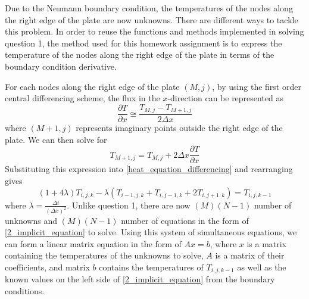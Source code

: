 \documentclass[a4paper]{article}
\begin{document}
	Due to the Neumann boundary condition, the temperatures of the nodes along the right edge of the plate are now unknowns. There are different ways to tackle this problem. In order to reuse the functions and methods implemented in solving question 1, the method used for this homework assignment is to express the temperature of the nodes along the right edge of the plate in terms of the boundary condition derivative.
	
	For each nodes along the right edge of the plate $(M,j)$, by using the first order central differencing scheme, the flux in the $x$-direction can be represented as
	\begin{equation*}
		\frac{\partial T}{\partial x}
		\cong
		\frac{T_{M,j} - T_{M+1,j}}{2\Delta x}
	\end{equation*}
	where $(M+1,j)$ represents imaginary points outside the right edge of the plate. We can then solve for
	\begin{equation*}
		T_{M+1,j} =
		T_{M,j} + 2\Delta x \frac{\partial T}{\partial x}
	\end{equation*}
	Substituting this expression into \autoref{heat_equation_differencing} and rearranging gives
	\begin{equation}
		(1 + 4 \lambda) T_{i,j,k}
		- \lambda(T_{i-1,j,k} + T_{i,j-1,k} + 2T_{i,j+1,k})
		=
		T_{i,j,k-1}
		\label{2_implicit_equation}
	\end{equation}
	where $\displaystyle{\lambda = \frac{\Delta t}{(\Delta x)^2}}$. Unlike question 1, there are now $(M)(N-1)$ number of unknowns and $(M)(N-1)$ number of equations in the form of \autoref{2_implicit_equation} to solve. Using this system of simultaneous equations, we can form a linear matrix equation in the form of $Ax=b$, where $x$ is a matrix containing the temperatures of the unknowns to solve, $A$ is a matrix of their coefficients, and matrix $b$ contains the temperatures of $T_{i,j,k-1}$ as well as the known values on the left side of \autoref{2_implicit_equation} from the boundary conditions.
	
\end{document}
